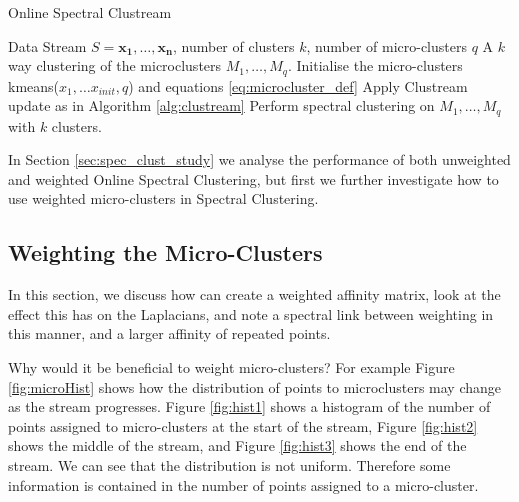 
\begin{algorithm}
\caption{Online Spectral Clustream}
\begin{algorithmic}[1]
\REQUIRE Data Stream $S = {\boldsymbol{x_1},\ldots, \boldsymbol{x_n}  }$, number of clusters $k$, number of micro-clusters $q$
\ENSURE A $k$ way clustering of the microclusters $M_1, \ldots, M_q$.
\STATE Initialise the micro-clusters kmeans($x_1, \hdots x_{init},q$) and equations \eqref{eq:microcluster_def}
 \STATE Apply Clustream update as in Algorithm \ref{alg:clustream}
   \STATE Perform spectral clustering on $M_1, \ldots, M_q$ with $k$ clusters.
\ENDIF
\ENDFOR

\end{algorithmic}
\label{alg:onlineSpec}
\end{algorithm}

In Section \ref{sec:spec_clust_study} we analyse the performance of both unweighted and weighted Online Spectral Clustering, but first we further investigate how to use weighted micro-clusters in Spectral Clustering.

\subsection{Weighting the Micro-Clusters}

In this section, we discuss how can create a weighted affinity matrix, look at the effect this has on the Laplacians, and note a spectral link between weighting in this manner, and a larger affinity of repeated points.

Why would it be beneficial to weight micro-clusters? For example Figure \ref{fig:microHist} shows how the distribution of points to microclusters may change as the stream progresses. Figure \ref{fig:hist1} shows a histogram of the number of points assigned to micro-clusters at the start of the stream, Figure \ref{fig:hist2} shows the middle of the stream, and Figure \ref{fig:hist3} shows the end of the stream. We can see that the distribution is not uniform. Therefore some information is contained in the number of points assigned to a micro-cluster. 

